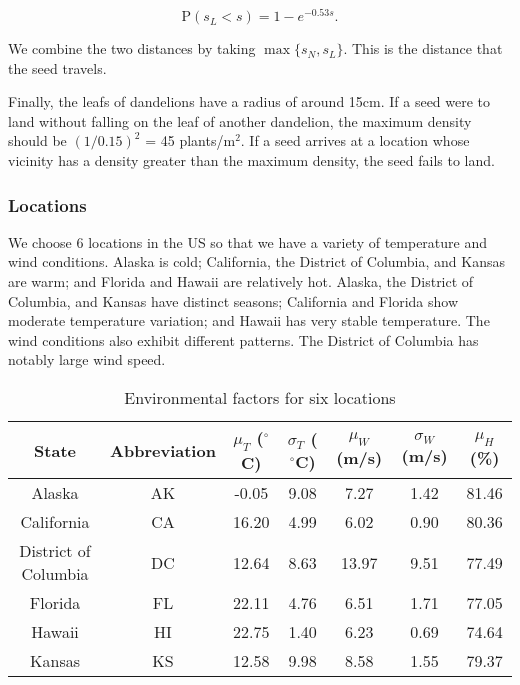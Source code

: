 \documentclass[12pt]{article}
\begin{document}
			\begin{equation}\label{eq:updraft}
				\mathrm{P} (s_L < s) = 1 - e^{-0.53 s}.
			\end{equation}
			
			We combine the two distances by taking $\max\{s_N, s_L\}$.   This is the distance that the seed travels.
			
			Finally, the leafs of dandelions have a radius of around 15cm.  If a seed were to land without falling on the leaf of another dandelion, the maximum density should be $(1/0.15)^2$ = 45 plants/m$^2$.  If a seed arrives at a location whose vicinity has a density greater than the maximum density, the seed fails to land.
		
		
		
		\subsubsection{Locations}
		
			We choose 6 locations in the US so that we have a variety of temperature and wind conditions.  Alaska is cold; California, the District of Columbia, and Kansas are warm; and Florida and Hawaii are relatively hot.  Alaska, the District of Columbia, and Kansas have distinct seasons; California and Florida show moderate temperature variation; and Hawaii has very stable temperature.  The wind conditions also exhibit different patterns.  The District of Columbia has notably large wind speed.
						
			{
				\fontsize{10}{14}\selectfont
				{
					\begin{longtable}{ccccccc}
						\caption{Environmental factors for six locations}
						\label{tb:locs}\\
						\toprule
						State&Abbreviation&$\mu_T$ ($^\circ$C)&$\sigma_T$ ($^\circ$C)&$\mu_W$ (m/s)&$\sigma_W$ (m/s)&$\mu_H$ (\%)\\
						\toprule
						Alaska&AK&-0.05&9.08&7.27&1.42&81.46\\
						California&CA&16.20&4.99&6.02&0.90&80.36\\
						District of Columbia&DC&12.64&8.63&13.97&9.51&77.49\\
						Florida&FL&22.11&4.76&6.51&1.71&77.05\\
						Hawaii&HI&22.75&1.40&6.23&0.69&74.64\\
						Kansas&KS&12.58&9.98&8.58&1.55&79.37\\
						\bottomrule
					\end{longtable}
				}
			}
		
\end{document}
